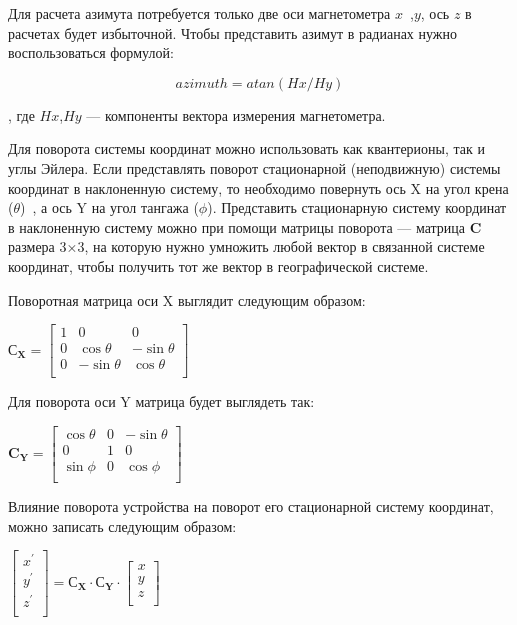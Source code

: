 Для расчета азимута потребуется только две оси магнетометра $x$~,$y$, ось $z$ в расчетах будет избыточной.
Чтобы представить азимут в радианах нужно воспользоваться формулой:

$$ azimuth = atan(Hx/Hy)$$

, где $Hx$,$Hy$ --- компоненты вектора измерения магнетометра. 

Для поворота системы координат можно использовать как квантерионы, так и углы Эйлера.
Если представлять поворот стационарной (неподвижную) системы координат в наклоненную систему, то
необходимо повернуть ось X на угол крена ($\theta$)~, а ось Y на угол тангажа ($\phi$).
Представить стационарную систему координат в наклоненную систему можно при помощи матрицы поворота ---
матрица $\mathbf{C}$ размера 3×3, на которую нужно умножить любой вектор в связанной системе координат, 
чтобы получить тот же вектор в географической системе.

Поворотная матрица оси X выглядит следующим образом:

$\mathbf{С_X}= \begin{bmatrix} 1 & 0 & 0 \\ 
                                  0 & \cos{\theta} & -\sin{\theta} \\ 
                                  0 & -\sin{\theta} & \cos{\theta} \\ 
                  \end{bmatrix}$

Для поворота оси Y матрица будет выглядеть так:

$\mathbf{C_Y}= \begin{bmatrix} \cos{\theta} & 0 & -\sin{\theta} \\ 
    0 & 1 & 0 \\ 
    \sin{\phi} & 0 & \cos{\phi} \\ 
\end{bmatrix}$

Влияние поворота устройства на поворот его стационарной систему координат,
можно записать следующим образом:

$ \begin{bmatrix} x^' \\ y^' \\ z^' \\ \end{bmatrix} = 
\mathbf{С_X} \cdot \mathbf{С_Y} \cdot \begin{bmatrix} x \\ y \\ z \\ \end{bmatrix} $

